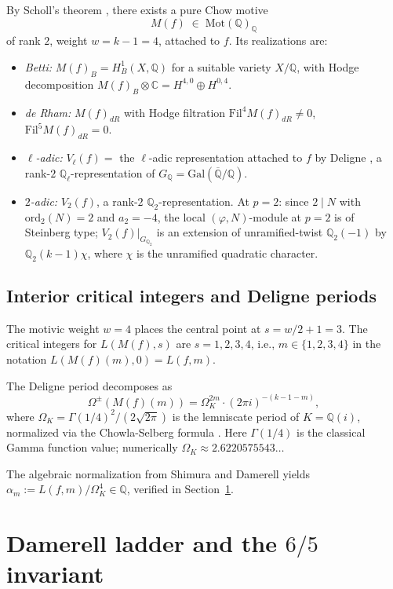 \documentclass[12pt]{amsart}
\theoremstyle{definition}
\newcommand{\Q}{\mathbb{Q}}
\newcommand{\C}{\mathbb{C}}
\newcommand{\Gal}{\mathrm{Gal}}
\newcommand{\ord}{\mathrm{ord}}
\begin{document}
By Scholl's theorem \cite{Sch90}, there exists a pure Chow motive
\[
  M(f) \;\in\; \mathrm{Mot}(\Q)_\Q
\]
of rank $2$, weight $w = k-1 = 4$, attached to $f$. Its realizations are:
\begin{itemize}
  \item \emph{Betti:} $M(f)_B = H^1_B(X,\Q)$ for a suitable variety $X/\Q$,
    with Hodge decomposition $M(f)_B \otimes \C = H^{4,0} \oplus H^{0,4}$.
  \item \emph{de Rham:} $M(f)_{dR}$ with Hodge filtration
    $\mathrm{Fil}^4 M(f)_{dR} \neq 0$, $\mathrm{Fil}^5 M(f)_{dR} = 0$.
  \item \emph{$\ell$-adic:} $V_\ell(f) = $ the $\ell$-adic representation attached to $f$
    by Deligne \cite{Del71}, a rank-$2$ $\Q_\ell$-representation of $G_\Q = \Gal(\overline{\Q}/\Q)$.
  \item \emph{$2$-adic:} $V_2(f)$, a rank-$2$ $\Q_2$-representation.
    At $p = 2$: since $2 \mid N$ with $\ord_2(N) = 2$ and $a_2 = -4$,
    the local $(\varphi, N)$-module at $p=2$ is of Steinberg type;
    $V_2(f)|_{G_{\Q_2}}$ is an extension of unramified-twist
    $\Q_2(-1)$ by $\Q_2(k-1)\chi$, where $\chi$ is the unramified quadratic character.
\end{itemize}

\subsection{Interior critical integers and Deligne periods}

The motivic weight $w = 4$ places the central point at $s = w/2 + 1 = 3$.
The critical integers for $L(M(f), s)$ are $s = 1, 2, 3, 4$, i.e.,
$m \in \{1,2,3,4\}$ in the notation $L(M(f)(m), 0) = L(f, m)$.

The Deligne period \cite{Del79} decomposes as
\[
  \Omega^\pm(M(f)(m)) = \Omega_K^{2m} \cdot (2\pi i)^{-(k-1-m)},
\]
where $\Omega_K = \Gamma(1/4)^2/(2\sqrt{2\pi})$ is the lemniscate period
of $K = \Q(i)$, normalized via the Chowla-Selberg formula \cite{CS67}.
Here $\Gamma(1/4)$ is the classical Gamma function value; numerically
$\Omega_K \approx 2.6220575543\ldots$

The algebraic normalization from Shimura \cite{Shim76} and Damerell
\cite{Dam70, Dam71} yields $\alpha_m := L(f,m)/\Omega_K^4 \in \Q$,
verified in Section~\ref{sec:damerell}.

\section{Damerell ladder and the \texorpdfstring{$6/5$}{6/5} invariant}
\label{sec:damerell}
\end{document}
